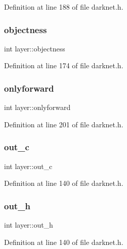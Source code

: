 Definition at line 188 of file darknet.\+h.

\mbox{\label{structlayer_aaf0a24ead54282e6bbb9c766f357c57f}} 
\subsubsection{\texorpdfstring{objectness}{objectness}}
{\footnotesize\ttfamily int layer\+::objectness}



Definition at line 174 of file darknet.\+h.

\mbox{\label{structlayer_a975a97f550b56c3503feba36b8eacf45}} 
\subsubsection{\texorpdfstring{onlyforward}{onlyforward}}
{\footnotesize\ttfamily int layer\+::onlyforward}



Definition at line 201 of file darknet.\+h.

\mbox{\label{structlayer_a298d150dabc449824204579f4851b926}} 
\subsubsection{\texorpdfstring{out\_c}{out\_c}}
{\footnotesize\ttfamily int layer\+::out\+\_\+c}



Definition at line 140 of file darknet.\+h.

\mbox{\label{structlayer_a8f8224d0915a9903d93874aefe278f98}} 
\subsubsection{\texorpdfstring{out\_h}{out\_h}}
{\footnotesize\ttfamily int layer\+::out\+\_\+h}



Definition at line 140 of file darknet.\+h.

